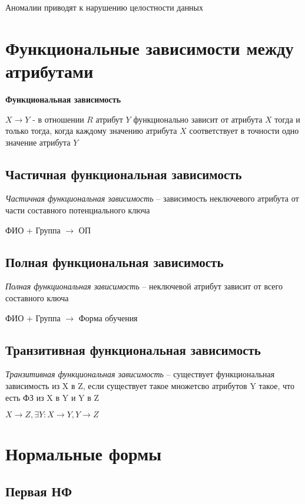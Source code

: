\documentclass[12pt, a4paper]{article}
\begin{document}
Аномалии приводят к нарушению целостности данных

\section{Функциональные зависимости между атрибутами}

\textbf{Функциональная зависимость}

$X \rightarrow Y$ - в отношении $R$ атрибут $Y$ функционально зависит от атрибута $X$ тогда и только тогда, когда каждому значению атрибута $X$ соответствует в точности одно значение атрибута $Y$

\subsection{Частичная функциональная зависимость}

\emph{Частичная функциональная зависимость} -- зависимость неключевого атрибута от части составного потенциального ключа

{ФИО + Группа} $\rightarrow$ ОП

\subsection{Полная функциональная зависимость}

\emph{Полная функциональная зависимость} -- неключевой атрибут зависит от всего составного ключа

{ФИО + Группа} $\rightarrow$ Форма обучения

\subsection{Транзитивная функциональная зависимость}

\emph{Транзитивная функциональная зависимость} -- существует функциональная зависимость из X в Z, если существует такое множетсво атрибутов Y такое, что есть ФЗ из X в Y и Y в Z

$X \rightarrow Z, \exists Y: X \rightarrow Y, Y \rightarrow Z$

\newpage

\section{Нормальные формы}

\subsection{Первая НФ}
\end{document}
